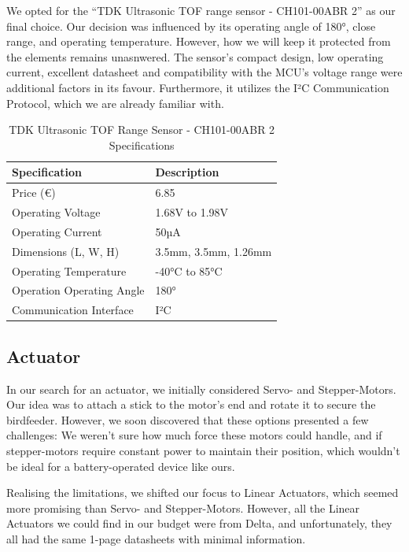 \documentclass[12pt,a4paper]{article}
\begin{document}
We opted for the “TDK Ultrasonic TOF range sensor - CH101-00ABR 2” as our final choice. Our decision was  influenced by its operating angle of 180°, close range, and operating temperature. However, how we will keep it protected from the elements remains unasnwered. The sensor's compact design, low operating current, excellent datasheet and compatibility with the MCU's voltage range were additional factors in its favour. Furthermore, it utilizes the I²C Communication Protocol, which we are already familiar with. 

\begin{table}[h]
\centering
\begin{tabular}{|l|l|}
\hline
\textbf{Specification} & \textbf{Description} \\ \hline
Price (€)              & 6.85                 \\ \hline
Operating Voltage      & 1.68V to 1.98V       \\ \hline
Operating Current      & 50µA                 \\ \hline
Dimensions (L, W, H)   & 3.5mm, 3.5mm, 1.26mm \\ \hline
Operating Temperature  & -40°C to 85°C        \\ \hline
Operation Operating Angle & 180°              \\ \hline
Communication Interface & I²C                 \\ \hline
\end{tabular}
\caption{TDK Ultrasonic TOF Range Sensor - CH101-00ABR 2 Specifications}
\label{tab:tdk_sensor_specs}
\end{table}

\subsection{Actuator}
In our search for an actuator, we initially considered Servo- and Stepper-Motors. Our idea was to attach a stick to the motor's end and rotate it to secure the birdfeeder. However, we soon discovered that these options presented a few challenges: We weren't sure how much force these motors could handle, and if stepper-motors require constant power to maintain their position, which wouldn't be ideal for a battery-operated device like ours. 

Realising the limitations, we shifted our focus to Linear Actuators, which seemed more promising than Servo- and Stepper-Motors. However, all the Linear Actuators we could find in our budget were from Delta, and unfortunately, they all had the same 1-page datasheets with minimal information. 
\end{document}
